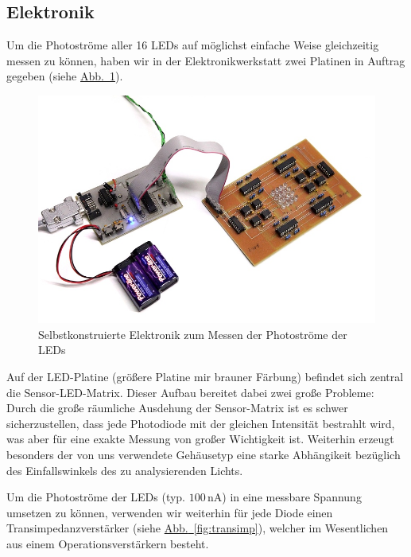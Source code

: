 \documentclass[11pt]{scrartcl}
\newcommand{\unit}[1]{\ensuremath{\,\mathrm{#1}}} %
\newcommand{\hypref}[2]{\hyperref[#2]{{#1}~\ref{#2}}}
\begin{document}
\subsection{Elektronik}

Um die Photoströme aller 16 LEDs auf möglichst einfache Weise gleichzeitig messen zu können, haben wir in der Elektronikwerkstatt zwei Platinen in Auftrag gegeben (siehe \hypref{Abb.}{fig:electronics}).

\begin{figure}[h]
\begin{center}
\includegraphics[width=1.\textwidth]{platinen.jpg}
\end{center}
\vspace{-1.5\baselineskip}
\caption{Selbstkonstruierte Elektronik zum Messen der Photoströme der LEDs}
\label{fig:electronics}
\end{figure}

Auf der LED-Platine (größere Platine mir brauner Färbung) befindet sich zentral die Sensor-LED-Matrix. Dieser Aufbau bereitet dabei zwei große Probleme: Durch die große räumliche Ausdehung der Sensor-Matrix ist es schwer sicherzustellen, dass jede Photodiode mit der gleichen Intensität bestrahlt wird, was aber für eine exakte Messung von großer Wichtigkeit ist. Weiterhin erzeugt besonders der von uns verwendete Gehäusetyp eine starke Abhängikeit bezüglich des Einfallswinkels des zu analysierenden Lichts.

Um die Photoströme der LEDs (typ. $100 \unit{nA}$) in eine messbare Spannung umsetzen zu können, verwenden wir weiterhin für jede Diode einen Transimpedanzverstärker (siehe \hypref{Abb.}{fig:transimp}), welcher im Wesentlichen aus einem Operationsverstärkern besteht. 
\end{document}
